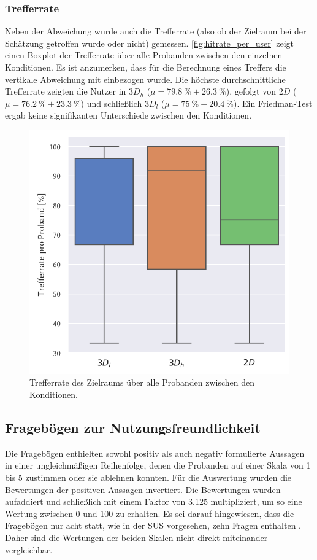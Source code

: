 \subsubsection*{Trefferrate}
Neben der Abweichung wurde auch die Trefferrate (also ob der Zielraum bei der Schätzung getroffen wurde oder nicht) gemessen.
\autoref{fig:hitrate_per_user} zeigt einen Boxplot der Trefferrate über alle Probanden zwischen den einzelnen Konditionen.
Es ist anzumerken, dass für die Berechnung eines Treffers die vertikale Abweichung mit einbezogen wurde.
Die höchste durchschnittliche Trefferrate zeigten die Nutzer in $3D_h$ ($\mu = \SI{79,8}{\percent} \pm \SI{26,3}{\percent}$), gefolgt von $2D$ ($\mu = \SI{76,2}{\percent} \pm \SI{23,3}{\percent}$) und schließlich $3D_l$ ($\mu = \SI{75}{\percent} \pm \SI{20,4}{\percent}$).
Ein Friedman-Test ergab keine signifikanten Unterschiede zwischen den Konditionen.
\begin{figure}[h]
    \centering
    \includegraphics[width=0.7\linewidth]{figures/analysis/hitrate_per_user}
    \caption{Trefferrate des Zielraums über alle Probanden zwischen den Konditionen.}
    \label{fig:hitrate_per_user}
\end{figure}

\subsection{Fragebögen zur Nutzungsfreundlichkeit}
Die Fragebögen enthielten sowohl positiv als auch negativ formulierte Aussagen in einer ungleichmäßigen Reihenfolge, denen die Probanden auf einer Skala von 1 bis 5 zustimmen oder sie ablehnen konnten.
Für die Auswertung wurden die Bewertungen der positiven Aussagen invertiert.
Die Bewertungen wurden aufaddiert und schließlich mit einem Faktor von \num{3,125} multipliziert, um so eine Wertung zwischen 0 und 100 zu erhalten.
Es sei darauf hingewiesen, dass die Fragebögen nur acht statt, wie in der SUS vorgesehen, zehn Fragen enthalten \autocite{Brooke2013}. 
Daher sind die Wertungen der beiden Skalen nicht direkt miteinander vergleichbar.

